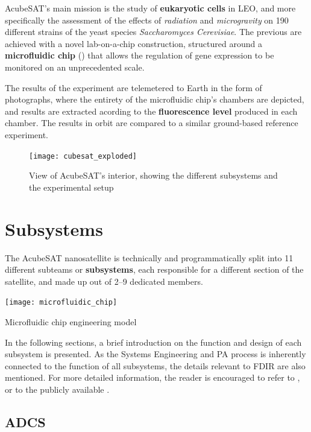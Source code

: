 \documentclass[a4paper,nobib]{tufte-book}
\begin{document}
AcubeSAT's main mission is the study of \textbf{eukaryotic cells} in \acl{LEO}, and more specifically the assessment of the effects of \emph{radiation} and \emph{microgravity} on 190 different strains of the yeast species \emph{Saccharomyces Cerevisiae}. The previous are achieved with a novel lab-on-a-chip construction, structured around a \textbf{microfluidic chip} () \autocite{volpetti_microfluidic_biodisplay_2017} that allows the regulation of gene expression to be monitored on an unprecedented scale.

The results of the experiment are telemetered to Earth in the form of photographs, where the entirety of the microfluidic chip's chambers are depicted, and results are extracted acording to the \textbf{fluorescence level} produced in each chamber. The results in orbit are compared to a similar ground-based reference experiment.

\begin{figure}[t]
	\centering
	\texttt{[image: cubesat\_exploded]}
	\caption{View of AcubeSAT's interior, showing the different subsystems and the experimental setup}
\end{figure}

\section{Subsystems}

The AcubeSAT nanosatellite is technically and programmatically split into 11 different subteams or \textbf{subsystems}, each responsible for a different section of the satellite, and made up out of \SIrange{2}{9}{} dedicated members.

\begin{marginfigure}
	\texttt{[image: microfluidic\_chip]}
	\caption{Microfluidic chip engineering model}
	\label{fig:microfluidic_chip}
\end{marginfigure}

In the following sections, a brief introduction on the function and design of each subsystem is presented. As the Systems Engineering and \acl{PA} process is inherently connected to the function of all subsystems, the details relevant to \acs{FDIR} are also mentioned. For more detailed information, the reader is encouraged to refer to , or to the publicly available .
\subsection{\acf{ADCS}}
\label{sec:adcs}
\end{document}
